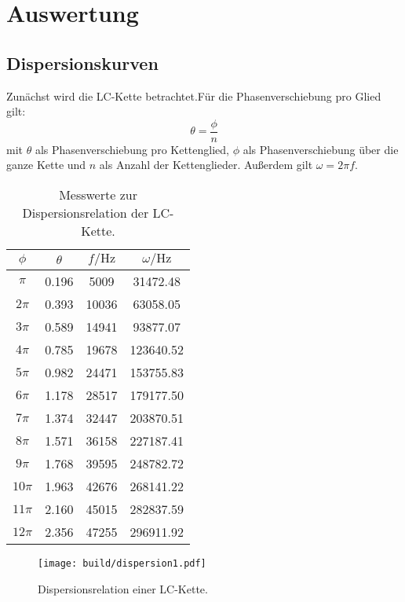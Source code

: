 \section{Auswertung}
\label{sec:Auswertung} 

\subsection{Dispersionskurven}
Zunächst wird die LC-Kette betrachtet.Für die Phasenverschiebung pro Glied gilt:
\begin{equation}
  \theta = \frac{\phi}{n}
\end{equation}
mit $\theta$ als Phasenverschiebung pro Kettenglied, $\phi$ als Phasenverschiebung über die ganze Kette und $n$ als Anzahl der Kettenglieder.
Außerdem gilt $\omega = 2\pi f$.

\begin{table}
  \centering
  \caption{Messwerte zur Dispersionsrelation der LC-Kette.}
  \label{tab:dispersion1}
  \begin{tabular}{c c c c}
    \toprule
    $\phi$ & $\theta$ & $f / \si{\hertz}$ & $\omega / \si{\hertz}$ \\
    \midrule
$\pi$ & 0.196 & 5009 & 31472.48 \\
$2\pi$ & 0.393 & 10036 & 63058.05 \\
$3\pi$ & 0.589 & 14941 & 93877.07 \\
$4\pi$ & 0.785 & 19678 & 123640.52 \\
$5\pi$ & 0.982 & 24471 & 153755.83 \\
$6\pi$ & 1.178 & 28517 & 179177.50 \\
$7\pi$ & 1.374 & 32447 & 203870.51 \\
$8\pi$ & 1.571 & 36158 & 227187.41 \\
$9\pi$ & 1.768 & 39595 & 248782.72 \\
$10\pi$ & 1.963 & 42676 & 268141.22 \\
$11\pi$ & 2.160 & 45015 & 282837.59 \\
$12\pi$ & 2.356 & 47255 & 296911.92 \\
\bottomrule
\end{tabular}
\end{table}

\begin{figure}
  \centering
  \texttt{[image: build/dispersion1.pdf]}
\caption{Dispersionsrelation einer LC-Kette.}
  \label{fig:dispersion-lc}
\end{figure}

